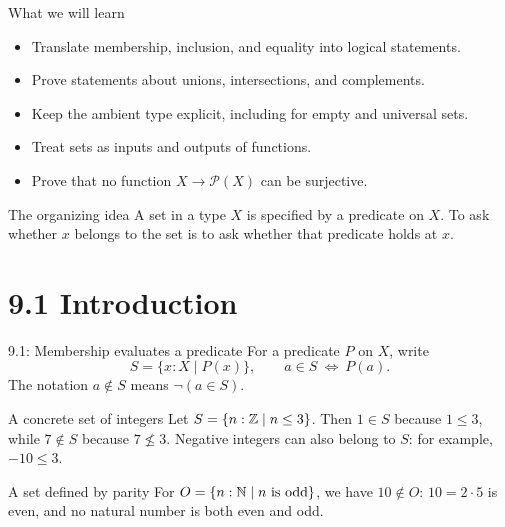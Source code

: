 

\begin{frame}
\titlepage
\end{frame}

\begin{frame}{What we will learn}
\begin{itemize}
\item Translate membership, inclusion, and equality into logical statements.
\item Prove statements about unions, intersections, and complements.
\item Keep the ambient type explicit, including for empty and universal sets.
\item Treat sets as inputs and outputs of functions.
\item Prove that no function $X\to\mathcal P(X)$ can be surjective.
\end{itemize}
\begin{block}{The organizing idea}
A set in a type $X$ is specified by a predicate on $X$.
To ask whether $x$ belongs to the set is to ask whether that predicate holds at $x$.
\end{block}
\end{frame}

\section{9.1 Introduction}
\begin{frame}{9.1: Membership evaluates a predicate}
For a predicate $P$ on $X$, write
\[
 S=\{x:X\mid P(x)\},\qquad a\in S\ \Longleftrightarrow\ P(a).
\]
The notation $a\notin S$ means $\neg(a\in S)$.
\begin{exampleblock}{A concrete set of integers}
Let $S=\{n:\mathbb{Z}\mid n\le3\}$.
Then $1\in S$ because $1\le3$, while $7\notin S$ because $7\nleq3$.
Negative integers can also belong to $S$: for example, $-10\le3$.
\end{exampleblock}
\begin{exampleblock}{A set defined by parity}
For $O=\{n:\mathbb{N}\mid n\text{ is odd}\}$, we have $10\notin O$:
$10=2\cdot5$ is even, and no natural number is both even and odd.
\end{exampleblock}
\end{frame}


